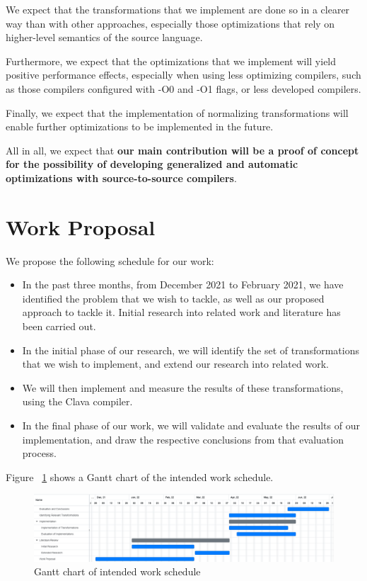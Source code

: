 We expect that the transformations that we implement are done so in a clearer way than with other approaches, especially those optimizations that rely on higher-level semantics of the source language.

Furthermore, we expect that the optimizations that we implement will yield positive performance effects, especially when using less optimizing compilers, such as those compilers configured with -O0 and -O1 flags, or less developed compilers.

Finally, we expect that the implementation of normalizing transformations will enable further optimizations to be implemented in the future.

All in all, we expect that \textbf{our main contribution will be a proof of concept for the possibility of developing generalized and automatic optimizations with source-to-source compilers}.

\section{Work Proposal}

We propose the following schedule for our work:

\begin{itemize}
    \item In the past three months, from December 2021 to February 2021, we have identified the problem that we wish to tackle, as well as our proposed approach to tackle it. Initial research into related work and literature has been carried out.
    \item In the initial phase of our research, we will identify the set of transformations that we wish to implement, and extend our research into related work.
    \item We will then implement and measure the results of these transformations, using the Clava compiler.
    \item In the final phase of our work, we will validate and evaluate the results of our implementation, and draw the respective conclusions from that evaluation process.
\end{itemize}

Figure ~\ref{fig:gantt} shows a Gantt chart of the intended work schedule.

\begin{figure}
    \centering
    \includegraphics[width=\textwidth]{figures/gantt.png}
    \caption{Gantt chart of intended work schedule}
    \label{fig:gantt}
\end{figure}
